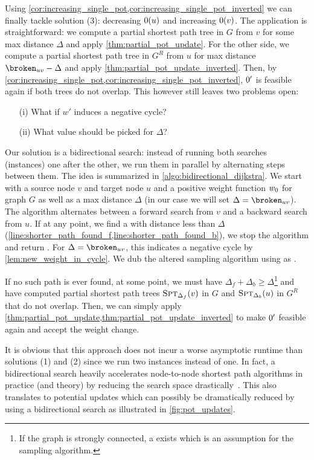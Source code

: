 Using \cref{cor:increasing_single_pot,cor:increasing_single_pot_inverted} we can finally tackle solution (3): decreasing $\pot(u)$ and increasing $\pot(v)$.
The application is straightforward: we compute a partial shortest path tree in $G$ from $v$ for some max distance $\Delta$ and apply \cref{thm:partial_pot_update}.
For the other side, we compute a partial shortest path tree in $G^R$ from $u$ for max distance $\brokuv - \Delta$ and apply \cref{thm:partial_pot_update_inverted}.
Then, by \cref{cor:increasing_single_pot,cor:increasing_single_pot_inverted}, $\pot'$ is feasible again if both trees do not overlap.
This however still leaves two problems open: 
\begin{itemize}
  \item[(i)] What if $w'$ induces a negative cycle?
  \item[(ii)] What value should be picked for $\Delta$?
\end{itemize}

Our solution is a bidirectional search: instead of running both searches (\algdk instances) one after the other, we run them in parallel by alternating steps between them.
The idea is summarized in \cref{algo:bidirectional_dijkstra}.
We start with a source node $v$ and target node $u$ and a positive weight function $\wpot$ for graph $G$ as well as a max distance $\Delta$ (in our case we will set $\Delta = \brokuv$).
The algorithm alternates between a forward \algdk search from $v$ and a backward \algdk search from $u$.
If at any point, we find a  with distance less than $\Delta$ (\cref{line:shorter_path_found_f,line:shorter_path_found_b}), we stop the algorithm and return \shorterpath.
For $\Delta = \brokuv$, this indicates a negative cycle by \cref{lem:new_weight_in_cycle}.
We dub the altered sampling algorithm using \algbd as \algbp.

If no such path is ever found, at some point, we must have $\Delta_f + \Delta_b \geq \Delta$\footnote{
  If the graph is strongly connected, \ie a  exists which is an assumption for the sampling algorithm.
} and have computed partial shortest path trees $\textsc{Spt}_{\Delta_f}(v)$ in $G$ and $\textsc{Spt}_{\Delta_b}(u)$ in $G^R$ that do not overlap.
Then, we can simply apply \cref{thm:partial_pot_update,thm:partial_pot_update_inverted} to make $\pot'$ feasible again and accept the weight change.

It is obvious that this approach does not incur a worse asymptotic runtime than solutions (1) and (2) since we run two \algdk instances instead of one.
In fact, a bidirectional search heavily accelerates node-to-node shortest path algorithms in practice (and theory) by reducing the search space drastically~\cite{DBLP:journals/jea/BorassiN19,DBLP:conf/iwoca/BlasiusW23,DBLP:journals/talg/BlasiusFFKMT22}.
This also translates to potential updates which can possibly be dramatically reduced by using a bidirectional search as illustrated in \cref{fig:pot_updates}.

